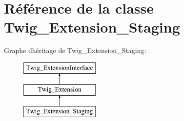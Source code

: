 \hypertarget{class_twig___extension___staging}{}\section{Référence de la classe Twig\+\_\+\+Extension\+\_\+\+Staging}
\label{class_twig___extension___staging}
Graphe d\textquotesingle{}héritage de Twig\+\_\+\+Extension\+\_\+\+Staging\+:\begin{figure}[H]
\begin{center}
\leavevmode
\includegraphics[height=3.000000cm]{class_twig___extension___staging}
\end{center}
\end{figure}
